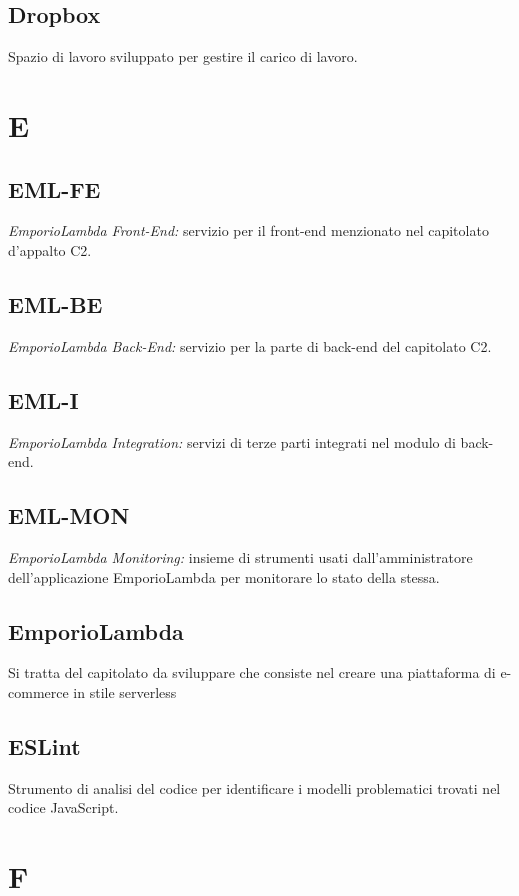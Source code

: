 \subsection*{Dropbox}
Spazio di lavoro sviluppato per gestire il carico di lavoro. 

\newpage
\section{E}
\subsection*{EML-FE}
\textit{EmporioLambda Front-End:} servizio per il front-end menzionato nel capitolato d'appalto C2.

\subsection*{EML-BE}
\textit{EmporioLambda Back-End:} servizio per la parte di back-end del capitolato C2.

\subsection*{EML-I}
\textit{EmporioLambda Integration:} servizi di terze parti integrati nel modulo di back-end.

\subsection*{EML-MON}
\textit{EmporioLambda Monitoring:} insieme di strumenti usati dall'amministratore dell'applicazione EmporioLambda per monitorare lo stato della stessa.

\subsection*{EmporioLambda}
Si tratta del capitolato da sviluppare che consiste nel creare una piattaforma di e-commerce in stile serverless

\subsection*{ESLint}
Strumento di analisi del codice per identificare i modelli problematici trovati nel codice JavaScript.

\newpage
\section{F}


